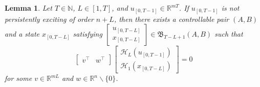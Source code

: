 \documentclass[journal,twoside,web]{ieeecolor}
\newtheorem{lemma}[theorem]{Lemma}
\begin{document}
\begin{lemma}
\label{lem:henk}
Let $T\in\mathbb{N}$, $L\in[1,T]$, and $u_{[0,T-1]}\in\mathbb{R}^{mT}$. If $u_{[0,T-1]}$ is not persistently exciting of order $n+L$, then there exists a controllable pair $(A,B)$ and a state $x_{[0,T-L]}$ satisfying $\begin{bmatrix}
u_{[0,T-L]} \\ x_{[0,T-L]}
\end{bmatrix}\in\mathfrak{B}_{T-L+1}(A,B)$ such that
\begin{equation}
\label{eq:lem:henk-1}
\begin{bmatrix}
v^\top & w^\top
\end{bmatrix}\begin{bmatrix}
\mathcal{H}_L(u_{[0,T-1]}) \\
\mathcal{H}_1(x_{[0,T-L]}) 
\end{bmatrix}=0
\end{equation}
for some $v\in\mathbb{R}^{mL}$ and $w\in\mathbb{R}^n\backslash\{0\}$.
\end{lemma}
\end{document}
